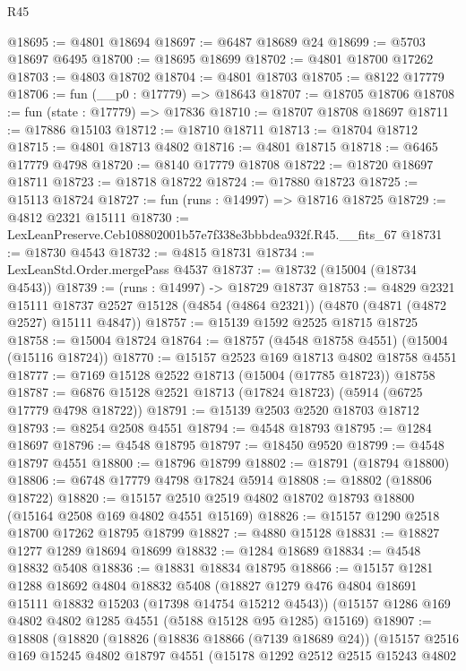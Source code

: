 \begin{lexlean}{R45}
\begin{coremodule}
@18695 := @4801 @18694
@18697 := @6487 @18689 @24
@18699 := @5703 @18697 @6495
@18700 := @18695 @18699
@18702 := @4801 @18700 @17262
@18703 := @4803 @18702
@18704 := @4801 @18703
@18705 := @8122 @17779
@18706 := fun (__p0 : @17779) => @18643
@18707 := @18705 @18706
@18708 := fun (state : @17779) => @17836
@18710 := @18707 @18708 @18697
@18711 := @17886 @15103
@18712 := @18710 @18711
@18713 := @18704 @18712
@18715 := @4801 @18713 @4802
@18716 := @4801 @18715
@18718 := @6465 @17779 @4798
@18720 := @8140 @17779 @18708
@18722 := @18720 @18697 @18711
@18723 := @18718 @18722
@18724 := @17880 @18723
@18725 := @15113 @18724
@18727 := fun (runs : @14997) => @18716 @18725
@18729 := @4812 @2321 @15111
@18730 := LexLeanPreserve.Ceb108802001b57e7f338e3bbbdea932f.R45.__fits_67
@18731 := @18730 @4543
@18732 := @4815 @18731
@18734 := LexLeanStd.Order.mergePass @4537
@18737 := @18732 (@15004 (@18734 @4543))
@18739 := (runs : @14997) -> @18729 @18737
@18753 := @4829
    @2321
    @15111
    @18737
    @2527
    @15128
    (@4854 (@4864 @2321))
    (@4870 (@4871 (@4872 @2527) @15111 @4847))
@18757 := @15139 @1592 @2525 @18715 @18725
@18758 := @15004 @18724
@18764 := @18757 (@4548 @18758 @4551) (@15004 (@15116 @18724))
@18770 := @15157 @2523 @169 @18713 @4802 @18758 @4551
@18777 := @7169 @15128 @2522 @18713 (@15004 (@17785 @18723)) @18758
@18787 := @6876 @15128 @2521 @18713 (@17824 @18723) (@5914 (@6725 @17779 @4798 @18722))
@18791 := @15139 @2503 @2520 @18703 @18712
@18793 := @8254 @2508 @4551
@18794 := @4548 @18793
@18795 := @1284 @18697
@18796 := @4548 @18795
@18797 := @18450 @9520
@18799 := @4548 @18797 @4551
@18800 := @18796 @18799
@18802 := @18791 (@18794 @18800)
@18806 := @6748 @17779 @4798 @17824 @5914
@18808 := @18802 (@18806 @18722)
@18820 := @15157 @2510 @2519 @4802 @18702 @18793 @18800 (@15164 @2508 @169 @4802 @4551 @15169)
@18826 := @15157 @1290 @2518 @18700 @17262 @18795 @18799
@18827 := @4880 @15128
@18831 := @18827 @1277 @1289 @18694 @18699
@18832 := @1284 @18689
@18834 := @4548 @18832 @5408
@18836 := @18831 @18834 @18795
@18866 := @15157
    @1281
    @1288
    @18692
    @4804
    @18832
    @5408
    (@18827 @1279 @476 @4804 @18691 @15111 @18832 @15203 (@17398 @14754 @15212 @4543))
    (@15157 @1286 @169 @4802 @4802 @1285 @4551 (@5188 @15128 @95 @1285) @15169)
@18907 := @18808
    (@18820
      (@18826
        (@18836 @18866 (@7139 @18689 @24))
        (@15157
          @2516
          @169
          @15245
          @4802
          @18797
          @4551
          (@15178
            @1292
            @2512
            @2515
            @15243
            @4802

\end{coremodule}
\end{lexlean}
